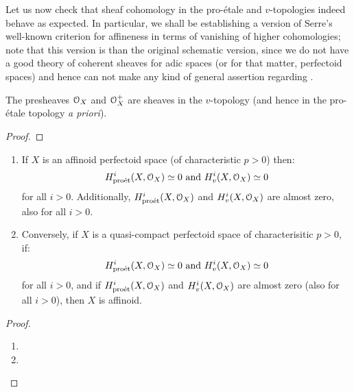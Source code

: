                 Let us now check that sheaf cohomology in the pro-\'etale and $v$-topologies indeed behave as expected. In particular, we shall be establishing a version of Serre's well-known criterion for affineness in terms of vanishing of higher cohomologies; note that this version is  than the original schematic version, since we do not have a good theory of coherent sheaves for adic spaces (or for that matter, perfectoid spaces) and hence can not make any kind of general assertion regarding .
                \begin{lemma} \label{lemma: structure_sheaves_are_pro_etale_sheaves_and_v_sheaves}
                    The presheaves $\mathcal{O}_X$ and $\mathcal{O}_X^+$ are sheaves in the $v$-topology (and hence in the pro-\'etale topology \textit{a priori}).
                \end{lemma}
                    \begin{proof}
                        
                    \end{proof}
                \begin{proposition} \label{prop: serre_affineness_for_perfectoid_spaces}
                    \noindent
                    \begin{enumerate}
                        \item If $X$ is an affinoid perfectoid space (of characteristic $p > 0$) then:
                            $$\text{$H^i_{\mathrm{pro\acute{e}t}}(X, \mathcal{O}_X) \simeq 0$ and $H^i_v(X, \mathcal{O}_X) \simeq 0$}$$
                        for all $i > 0$. Additionally, $H^i_{\mathrm{pro\acute{e}t}}(X, \mathcal{O}_X)$ and $H^i_v(X, \mathcal{O}_X)$ are almost zero, also for all $i > 0$.
                        \item Conversely, if $X$ is a quasi-compact perfectoid space of characterisitic $p > 0$, if:
                            $$\text{$H^i_{\mathrm{pro\acute{e}t}}(X, \mathcal{O}_X) \simeq 0$ and $H^i_v(X, \mathcal{O}_X) \simeq 0$}$$
                        for all $i > 0$, and if $H^i_{\mathrm{pro\acute{e}t}}(X, \mathcal{O}_X)$ and $H^i_v(X, \mathcal{O}_X)$ are almost zero (also for all $i > 0$), then $X$ is affinoid. 
                    \end{enumerate}
                \end{proposition}
                    \begin{proof}
                        \noindent
                        \begin{enumerate}
                            \item 
                            \item
                        \end{enumerate}
                    \end{proof}
    
